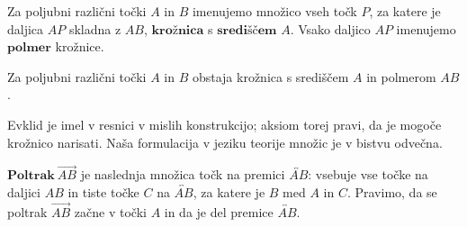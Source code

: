         
\begin{definicija}
    Za poljubni različni točki $A$ in $B$ imenujemo množico vseh točk $P$, za katere je daljica $AP$ skladna z $AB$, $\textbf{krožnica}$ s $\textbf{središčem}$ $A$. Vsako daljico $AP$ imenujemo $\textbf{polmer}$ krožnice.
\end{definicija}


\begin{aksiom}[E.3]
    Za poljubni različni točki $A$ in $B$ obstaja krožnica s središčem $A$ in polmerom $AB$.
\end{aksiom}

    Evklid je imel v resnici v mislih konstrukcijo; aksiom torej pravi, da je mogoče krožnico narisati. Naša formulacija v jeziku teorije množic je v bistvu odvečna.

\begin{definicija}
    $\textbf{Poltrak} ~\overrightarrow{AB}$ je naslednja množica točk na premici $\overleftrightarrow{AB}$: vsebuje vse točke na daljici $AB$ in tiste točke $C$ na $\overleftrightarrow{AB}$, za katere je $B$ med $A$ in $C$. Pravimo, da se poltrak $\overrightarrow{AB}$ začne v točki $A$ in da je del premice $\overleftrightarrow{AB}$.
\end{definicija}

